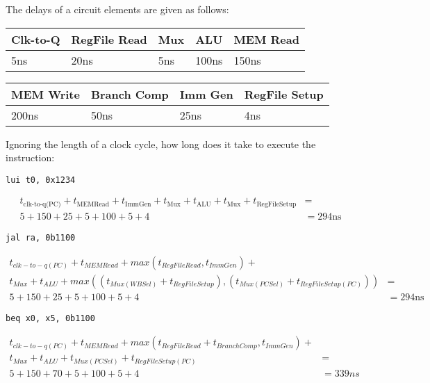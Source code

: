 \begin{blocksection}
The delays of a circuit elements are given as follows:

\begin{tabular}{ |l|l|l|l|l| } 
	\hline
	Clk-to-Q & RegFile Read & Mux & ALU & MEM Read \\ 
	\hline
	5ns & 20ns & 5ns & 100ns & 150ns \\ 
	\hline
\end{tabular}

\begin{tabular}{ |l|l|l|l| } 
	\hline
	MEM Write & Branch Comp & Imm Gen & RegFile Setup \\ 
	\hline
	200ns & 50ns & 25ns & 4ns \\ 
	\hline
\end{tabular}

\question
Ignoring the length of a clock cycle, how long does it take to execute the instruction:

\begin{parts}

	\item
	\lstinline$lui t0, 0x1234$
	\begin{solution}[0.3in]
		\begin{align*}
		t_{\text{clk-to-q(PC)}} + t_{\text{MEMRead}} + t_{\text{ImmGen}} + t_{\text{Mux}} + t_{\text{ALU}} + t_{\text{Mux}} + t_{\text{RegFileSetup}} &=\\
		5 + 150 + 25 + 5 + 100 + 5 + 4 &= 294\text{ns}
		\end{align*}
	\end{solution}

	\item
	\lstinline$jal ra, 0b1100$
	\begin{solution}[0.3in]
		\begin{align*}
		t_{clk-to-q(PC)} + t_{MEMRead} + max(t_{RegFileRead}, t_{ImmGen}) +\\
		 t_{Mux} + t_{ALU} + max((t_{Mux(WBSel)} + t_{RegFileSetup}), (t_{Mux(PCSel)} + t_{RegFileSetup(PC)})) &=\\
		5 + 150 + 25 + 5 + 100 + 5 + 4 &= 294\text{ns}
		\end{align*}
	\end{solution}


	\item
	\lstinline$beq x0, x5, 0b1100$
	\begin{solution}[0.5in]
		\begin{align*}
		t_{clk-to-q(PC)} + t_{MEMRead} + max(t_{RegFileRead} + t_{BranchComp}, t_{ImmGen}) +\\
		 t_{Mux} + t_{ALU} + t_{Mux(PCSel)} + t_{RegFileSetup(PC)} &=\\
		5 + 150 + 70 + 5 + 100 + 5 + 4 &= 339ns
		\end{align*}
	\end{solution}

\end{parts}
\end{blocksection}
